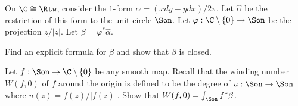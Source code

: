 On $\C\cong \Rtw$, consider the $1$-form $\alpha=(xdy-ydx)/2\pi$. Let
$\hat{\alpha}$ be the restriction of this form to the unit circle
$\Son$. Let $\varphi:\C\setminus \{0\}\rightarrow \Son$ be the
projection $z/|z|$. Let $\beta=\varphi^*\hat{\alpha}$.
\begin{alist}
\item Find an explicit formula for $\beta$ and show that $\beta$ is
closed.
\item Let $f:\Son\rightarrow \C\setminus \{0\}$ be any smooth map.
Recall that the winding number $W(f,0)$ of $f$ around the origin is
defined to be the degree of $u:\Son\rightarrow \Son$ where
$u(z)=f(z)/|f(z)|$. Show that $W(f,0)=\int_{\Son}f^*\beta$.
\end{alist}
